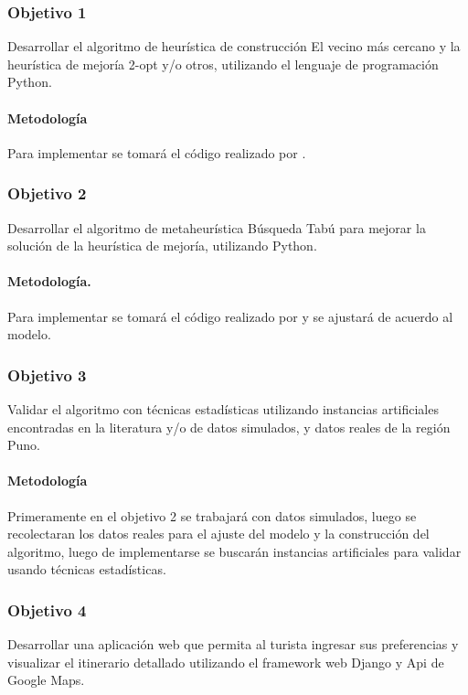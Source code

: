 \subsubsection{Objetivo 1}
Desarrollar el algoritmo de heurística de construcción El vecino más cercano y la heurística de mejoría 2-opt y/o otros, utilizando el lenguaje de programación Python.

\paragraph{Metodología}
Para implementar se tomará el código realizado por .

\subsubsection{Objetivo 2}
Desarrollar el algoritmo de metaheurística Búsqueda Tabú para mejorar la solución de la heurística de mejoría, utilizando Python.
\paragraph{Metodología.}
Para implementar se tomará el código realizado por  y se ajustará de acuerdo al modelo.
\subsubsection{Objetivo 3}
Validar el algoritmo con técnicas estadísticas utilizando instancias artificiales encontradas en la literatura y/o de datos simulados, y datos reales de la región Puno.
\paragraph{Metodología}
Primeramente en el objetivo 2 se trabajará con datos simulados, luego se recolectaran los datos reales para el ajuste del modelo y la construcción del algoritmo, luego de implementarse se buscarán instancias artificiales para validar usando técnicas estadísticas.
\subsubsection{Objetivo 4}
Desarrollar una aplicación web que permita al turista ingresar sus preferencias y visualizar el itinerario detallado utilizando el framework web Django y Api de Google Maps.
